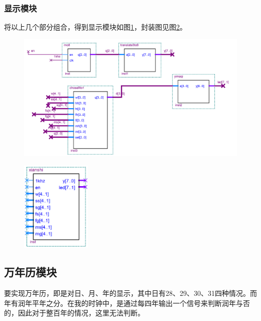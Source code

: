 \documentclass[12pt]{article}
\begin{document}
\subsubsection{显示模块}
将以上几个部分组合，得到显示模块如图\ref{fig:xianshi}，封装图见图\ref{fig:fengzhuangxianshi}。
\begin{figure}[hp]
	\centering  
	\includegraphics[width=\textwidth]{picture/xianshi.png} 
	\caption{}
	\label{fig:xianshi}   
\end{figure}
\begin{figure}[hp]
	\centering  
	\includegraphics[width=0.3\textwidth]{picture/fenzhuangxianshi.png} 
	\caption{}
	\label{fig:fengzhuangxianshi}   
\end{figure}\par
\subsection{万年历模块}
要实现万年历，即是对日、月、年的显示，其中日有28、29、30、31四种情况。而年有润年平年之分。在我的时钟中，是通过每四年输出一个信号来判断润年与否的，因此对于整百年的情况，这里无法判断。
\end{document}
